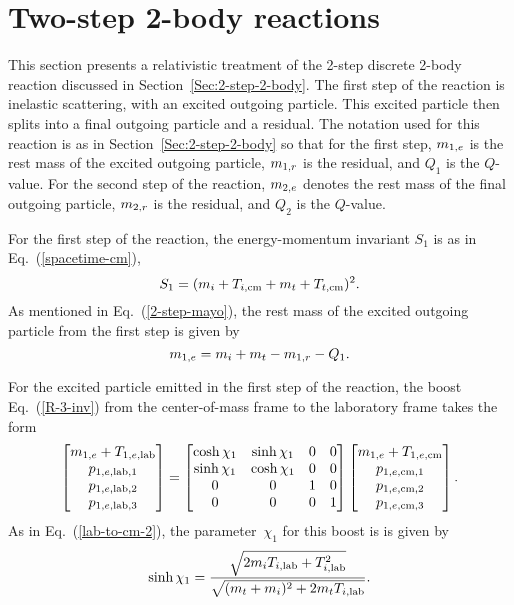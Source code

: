 {\section{Two-step 2-body reactions}
\label{Sec:2-step-2-body-rel}
This section presents a relativistic treatment of the 2-step
discrete 2-body reaction discussed in Section~\ref{Sec:2-step-2-body}.
The first step of the reaction is inelastic scattering, with an
excited outgoing particle.  This excited particle then splits into a final outgoing particle
and a residual.  The notation used for this reaction is as in
Section~\ref{Sec:2-step-2-body} so that for the first step, $m_{1,e}$ is the rest mass of
the excited outgoing particle, $m_{1,r}$ is the residual, and $Q_1$ is
the $Q$-value.  For the second step of the reaction, $m_{2,e}$ denotes the rest mass of
the final outgoing particle, $m_{2,r}$ is the residual, and $Q_2$ is
the $Q$-value.

For the first step of the reaction, the energy-momentum invariant $S_1$
is as in Eq.~(\ref{spacetime-cm}),
\begin{equation}
  S_1 = (m_i + T_{i,\textrm{cm}} + m_t + T_{t,\textrm{cm}})^2.
 \label{spacetime-cm-step1}
\end{equation}
As mentioned in Eq.~(\ref{2-step-mayo}), the rest mass of
the excited outgoing particle from the first step is given by
$$
  m_{1,e} = m_i + m_t - m_{1,r} - Q_1.
$$

For the excited particle emitted in the first step of the
reaction, the boost Eq.~(\ref{R-3-inv}) from the center-of-mass frame to the
laboratory frame takes the form
\begin{equation}
  \begin{bmatrix}
    m_{1,e} + T_{1,e,\textrm{lab}} \\
    p_{1,e,\textrm{lab},1} \\
    p_{1,e,\textrm{lab},2} \\
    p_{1,e,\textrm{lab},3}
  \end{bmatrix}
   =
    \begin{bmatrix}
     \cosh \chi_1 & \sinh \chi_1 & 0 & 0 \\
     \sinh \chi_1 & \cosh \chi_1 & 0 & 0 \\
     0  & 0 & 1 & 0 \\
     0  & 0 & 0 & 1
  \end{bmatrix}
  \begin{bmatrix}
    m_{1,e} + T_{1,e,\textrm{cm}} \\
    p_{1,e,\textrm{cm},1} \\
    p_{1,e,\textrm{cm},2} \\
    p_{1,e,\textrm{cm},3}
  \end{bmatrix}.
  \label{R-3-inv-step1}
\end{equation}
As in Eq.~(\ref{lab-to-cm-2}),
the parameter~$\chi_1$ for this boost
is is given by
\begin{equation}
  \sinh \chi_1 = \frac{\sqrt{ 2 m_i T_{i,\textrm{lab}} + T_{i,\textrm{lab}}^2}}
    {\sqrt{( m_t + m_i )^2 + 2 m_t T_{i,\textrm{lab}} }}.
  \label{lab-to-cm-2-step1}
\end{equation}

}
